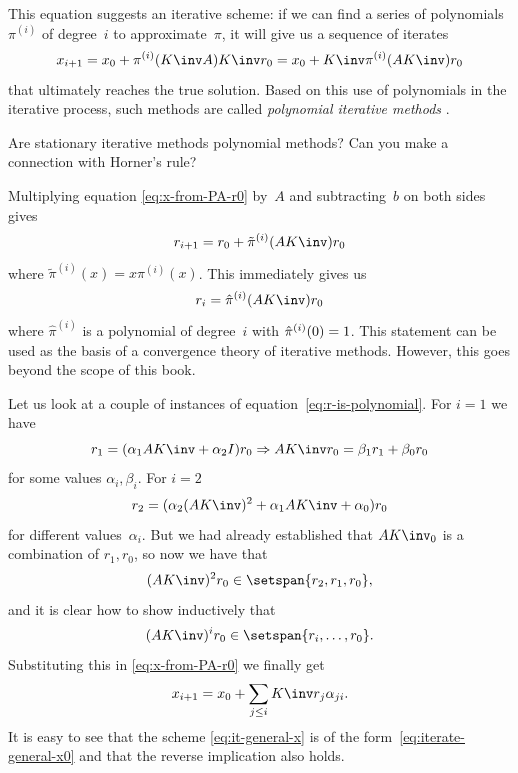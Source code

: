 This equation suggests an iterative scheme: if we can find a
series of polynomials~$\pi^{(i)}$ of degree~$i$
to approximate~$\pi$, it will give
us a sequence of iterates 
\begin{equation}
  x_{i+1} = x_0+\pi^{(i)}(K\inv A)K\inv r_0
  = x_0+K\inv \pi^{(i)}(AK\inv) r_0
  \label{eq:x-from-PA-r0}
\end{equation}
that ultimately reaches the true solution.
Based on this use of polynomials in the iterative process, such
methods are called
\emph{polynomial iterative methods}%
%
%
.

\begin{exercise}
  \label{ex:stat-horner-polynomial}
  Are stationary iterative methods polynomial methods?
  Can you make a connection with Horner's rule?
\end{exercise}

Multiplying equation \eqref{eq:x-from-PA-r0} by~$A$ and
subtracting~$b$ on both sides gives
\[ r_{i+1} = r_0+\tilde\pi^{(i)}(AK\inv)r_0 \]
where $\tilde\pi^{(i)}(x)=x\pi^{(i)}(x)$. This immediately gives us
\begin{equation}
  r_i = \hat\pi^{(i)}(AK\inv) r_0
  \label{eq:r-is-polynomial}
\end{equation}
where $\hat\pi^{(i)}$ is a polynomial of degree~$i$ with
$\hat\pi^{(i)}(0)=\nobreak1$. This statement can be used as the basis
of a convergence theory of iterative methods. However, this goes
beyond the scope of this book.

Let us look at a couple of instances of
equation~\eqref{eq:r-is-polynomial}. For $i=1$ we have
\[
  r_1 = (\alpha_1AK\inv+\alpha_2I)r_0 \Rightarrow 
  AK\inv r_0 = \beta_1r_1+\beta_0r_0
\]
for some values $\alpha_i,\beta_i$. For $i=2$
\[ r_2 = (\alpha_2(AK\inv )^2+\alpha_1AK\inv +\alpha_0)r_0 \]
for different values~$\alpha_i$. But we had already established that
$AK\inv_0$ is a combination of $r_1,r_0$, so now we have that 
\[ (AK\inv)^2r_0\in \setspan{r_2,r_1,r_0}, \]
and it is clear how to show inductively that 
\begin{equation}
  (AK\inv)^ir_0\in\setspan{r_i,\ldots,r_0}.
\end{equation}
Substituting this in \eqref{eq:x-from-PA-r0} we finally get
\begin{equation}
  x_{i+1} = x_0 +\sum_{j\leq i} K\inv r_j\alpha_{ji}.
  \label{eq:iterate-general-x0}
\end{equation}
It is easy to see that the scheme \eqref{eq:it-general-x} is of the
form~\eqref{eq:iterate-general-x0} and
that the reverse implication also holds.

